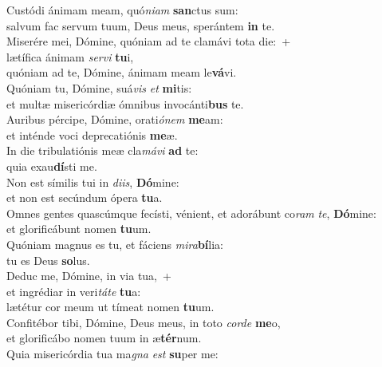 \evenverse Custódi ánimam meam, quó\textit{ni}\textit{am} \textbf{san}ctus sum:~\*\\
\evenverse salvum fac servum tuum, Deus meus, sperántem \textbf{in} te.\\
\oddverse Miserére mei, Dómine, quóniam ad te clamávi tota die:~+\\
\oddverse  lætífica ánimam \textit{ser}\textit{vi} \textbf{tu}i,~\*\\
\oddverse quóniam ad te, Dómine, ánimam meam le\textbf{vá}vi.\\
\evenverse Quóniam tu, Dómine, suá\textit{vis} \textit{et} \textbf{mi}tis:~\*\\
\evenverse et multæ misericórdiæ ómnibus invocánti\textbf{bus} te.\\
\oddverse Auribus pércipe, Dómine, orati\textit{ó}\textit{nem} \textbf{me}am:~\*\\
\oddverse et inténde voci deprecatiónis \textbf{me}æ.\\
\evenverse In die tribulatiónis meæ cla\textit{má}\textit{vi} \textbf{ad} te:~\*\\
\evenverse quia exau\textbf{dí}sti me.\\
\oddverse Non est símilis tui in \textit{di}\textit{is}, \textbf{Dó}mine:~\*\\
\oddverse et non est secúndum ópera \textbf{tu}a.\\
\evenverse Omnes gentes quascúmque fecísti, vénient, et adorábunt co\textit{ram} \textit{te}, \textbf{Dó}mine:~\*\\
\evenverse et glorificábunt nomen \textbf{tu}um.\\
\oddverse Quóniam magnus es tu, et fáciens \textit{mi}\textit{ra}\textbf{bí}lia:~\*\\
\oddverse tu es Deus \textbf{so}lus.\\
\evenverse Deduc me, Dómine, in via tua,~+\\
\evenverse  et ingrédiar in veri\textit{tá}\textit{te} \textbf{tu}a:~\*\\
\evenverse lætétur cor meum ut tímeat nomen \textbf{tu}um.\\
\oddverse Confitébor tibi, Dómine, Deus meus, in toto \textit{cor}\textit{de} \textbf{me}o,~\*\\
\oddverse et glorificábo nomen tuum in æ\textbf{tér}num.\\
\evenverse Quia misericórdia tua ma\textit{gna} \textit{est} \textbf{su}per me:~\*\\
